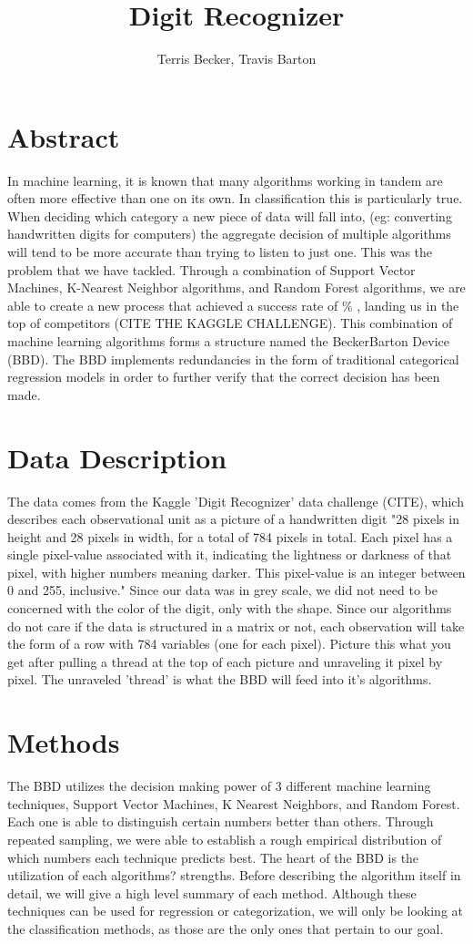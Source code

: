 \documentclass[11pt, oneside]{article}   	%
\title{Digit Recognizer}
\author{Terris Becker, Travis Barton}
\begin{document}
\maketitle
\section{Abstract}
In machine learning, it is known that many algorithms working in tandem are often more effective than one on its own. In classification this is particularly true. When deciding which category a new piece of data will fall into, (eg: converting handwritten digits for computers) the aggregate decision of multiple algorithms will tend to be more accurate than trying to listen to just one. This was the problem that we have tackled. Through a combination of Support Vector Machines, K-Nearest Neighbor algorithms, and Random Forest algorithms, we are able to create a new process that achieved a success rate of  \% , landing us in the top    of competitors (CITE THE KAGGLE CHALLENGE). This combination of machine learning algorithms forms a structure named the BeckerBarton Device (BBD). The BBD implements redundancies in the form of traditional categorical regression models in order to further verify that the correct decision has been made.

\section{Data Description}
The data comes from the Kaggle 'Digit Recognizer' data challenge (CITE), which describes each observational unit as a picture of a handwritten digit "28 pixels in height and 28 pixels in width, for a total of 784 pixels in total. Each pixel has a single pixel-value associated with it, indicating the lightness or darkness of that pixel, with higher numbers meaning darker. This pixel-value is an integer between 0 and 255, inclusive." Since our data was in grey scale, we did not need to be concerned with the color of the digit, only with the shape.
Since our algorithms do not care if the data is structured in a matrix or not, each observation will take the form of a row with 784 variables (one for each pixel). Picture this what you get after pulling a thread at the top of each picture and unraveling it pixel by pixel. The unraveled 'thread' is what the BBD will feed into it's algorithms.
\section{Methods}
The BBD utilizes the decision making power of 3 different machine learning techniques, Support Vector Machines, K Nearest Neighbors, and Random Forest. Each one is able to distinguish certain numbers better than others. Through repeated sampling, we were able to establish a rough empirical distribution of which numbers each technique predicts best. The heart of the BBD is the utilization of each algorithms? strengths. Before describing the algorithm itself in detail, we will give a high level summary of each method. Although these techniques can be used for regression or categorization, we will only be looking at the classification methods, as those are the only ones that pertain to our goal.
\end{document}

